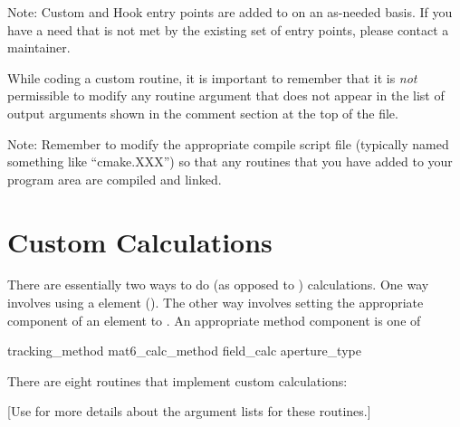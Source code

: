 \etcetc


Note: Custom and Hook entry points are added to \bmad on an as-needed basis. If you have a need that
is not met by the existing set of entry points, please contact a \bmad maintainer.


While coding a custom routine, it is important to remember that it is {\em not} permissible to
modify any routine argument that does not appear in the list of output arguments shown in the
comment section at the top of the file.

Note: Remember to modify the appropriate compile script file (typically named something like
``cmake.XXX'') so that any routines that you have added to your program area are compiled and
linked.

\section{Custom Calculations}
\label{s:custom.ele}

There are essentially two ways to do  (as opposed to ) calculations. One way
involves using a  element (). The other way involves setting the
appropriate  component of an element to . An appropriate method component is
one of
\begin{example}
  tracking_method       
  mat6_calc_method      
  field_calc            
  aperture_type         
\end{example}

There are eight routines that implement custom calculations:
\begin{example}
\end{example}
[Use  for more details about the argument lists for these
routines.]  


